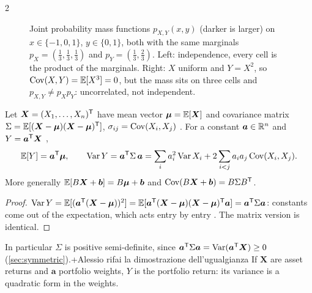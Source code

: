 \begin{paracol}{2}
\begin{figure}[!htb]
\centering
{}
\caption{Joint probability mass functions $p_{X,Y}(x,y)$ (darker is larger) on $x\in\{-1,0,1\}$, $y\in\{0,1\}$, both with the same marginals
$p_X=(\tfrac13,\tfrac13,\tfrac13)$ and $p_Y=(\tfrac13,\tfrac23)$. Left: independence, every cell is the product of the marginals. Right:
$X$ uniform and $Y=X^2$, so $\operatorname{Cov}(X,Y)=\mathbb{E}[X^3]=0$, but the mass sits on three cells and $p_{X,Y}\ne p_Xp_Y$: uncorrelated, not independent.}\label{ch03:fig-jointpmf}
\end{figure}

\begin{proposition}\label{ch03:prop-portvar}
Let $\bm X=(X_1,\dots,X_n)^{\mathsf T}$ have mean vector $\bm\mu=\mathbb{E}[\bm X]$ and covariance matrix
$\Sigma=\mathbb{E}[(\bm X-\bm\mu)(\bm X-\bm\mu)^{\mathsf T}]$, $\sigma_{ij}=\operatorname{Cov}(X_i,X_j)$ . For a constant $\bm a\in\mathbb{R}^n$ and
$Y=\bm a^{\mathsf T}\bm X$ ,
\[
  \mathbb{E}[Y]=\bm a^{\mathsf T}\bm\mu,\qquad
  \operatorname{Var} Y=\bm a^{\mathsf T}\Sigma\,\bm a=\sum_ia_i^2\operatorname{Var} X_i+2\sum_{i<j}a_ia_j\operatorname{Cov}(X_i,X_j) .
\]
More generally $\mathbb{E}[B\bm X+\bm b]=B\bm\mu+\bm b$ and $\operatorname{Cov}(B\bm X+\bm b)=B\Sigma B^{\mathsf T}$.
\end{proposition}
\begin{proof}
$\operatorname{Var} Y=\mathbb{E}[(\bm a^{\mathsf T}(\bm X-\bm\mu))^2]=\mathbb{E}[\bm a^{\mathsf T}(\bm X-\bm\mu)(\bm X-\bm\mu)^{\mathsf T}\bm a]=\bm a^{\mathsf T}\Sigma\bm a$: constants come out of the
expectation, which acts entry by entry . The matrix version is identical.
\end{proof}
In particular $\Sigma$ is positive semi-definite, since $\bm a^{\mathsf T}\Sigma\bm a=\operatorname{Var}(\bm a^{\mathsf T}\bm X)\ge0$ (\cref{sec:symmetric}).\note+{Alessio rifai la dimostrazione dell'ugualgianza}
If $\bm X$ are asset returns and $\bm a$ portfolio weights, $Y$ is the portfolio return: its variance is a
quadratic form in the weights.


\end{paracol}
